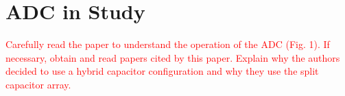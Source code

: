 \section{ADC in Study}

\textcolor{red}{Carefully read the paper to understand the operation of the ADC (Fig. 1). If
necessary, obtain and read papers cited by this paper. Explain why the authors decided to use a hybrid capacitor configuration and why they use the split capacitor array.}